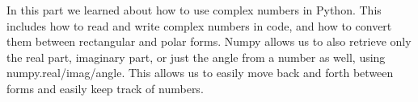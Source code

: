 In this part we learned about how to use complex numbers in Python. This includes how to read and write complex numbers in code, and how to convert them between rectangular and polar forms. Numpy allows us to also retrieve only the real part, imaginary part, or just the angle from a number as well, using numpy.real/imag/angle. This allows us to easily move back and forth between forms and easily keep track of numbers.

